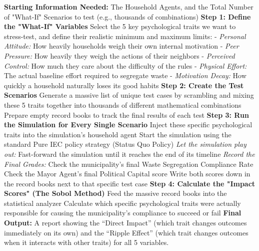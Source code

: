\begin{algorithm}[H]
\caption{Determining What Matters Most (Stress-Testing the Simulation)}
\label{alg:sobol_gsa_english}
\begin{algorithmic}[1]
\State \textbf{Starting Information Needed:} The Household Agents, and the Total Number of "What-If" Scenarios to test (e.g., thousands of combinations)
\Statex
\State \textbf{Step 1: Define the "What-If" Variables}
\State Select the 5 key psychological traits we want to stress-test, and define their realistic minimum and maximum limits:
\State \quad - \textit{Personal Attitude:} How heavily households weigh their own internal motivation
\State \quad - \textit{Peer Pressure:} How heavily they weigh the actions of their neighbors
\State \quad - \textit{Perceived Control:} How much they care about the difficulty of the rules
\State \quad - \textit{Physical Effort:} The actual baseline effort required to segregate waste
\State \quad - \textit{Motivation Decay:} How quickly a household naturally loses its good habits
\Statex
\State \textbf{Step 2: Create the Test Scenarios}
\State Generate a massive list of unique test cases by scrambling and mixing these 5 traits together into thousands of different mathematical combinations
\State Prepare empty record books to track the final results of each test
\Statex
\State \textbf{Step 3: Run the Simulation for Every Single Scenario}
    \State Inject these specific psychological traits into the simulation's household agent
    \State Start the simulation using the standard Pure IEC policy strategy (Status Quo Policy)
    \Statex
    \State \textit{Let the simulation play out:}
    \State Fast-forward the simulation until it reaches the end of its timeline
    \Statex
    \State \textit{Record the Final Grades:}
    \State Check the municipality's final Waste Segregation Compliance Rate
    \State Check the Mayor Agent's final Political Capital score
    \State Write both scores down in the record books next to that specific test case
\EndFor
\Statex
\State \textbf{Step 4: Calculate the "Impact Scores" (The Sobol Method)}
\State Feed the massive record books into the statistical analyzer
\State Calculate which specific psychological traits were actually responsible for causing the municipality's compliance to succeed or fail
\Statex
\State \textbf{Final Output:} A report showing the ``Direct Impact'' (which trait changes outcomes immediately on its own) and the ``Ripple Effect'' (which trait changes outcomes when it interacts with other traits) for all 5 variables.
\end{algorithmic}
\end{algorithm}


